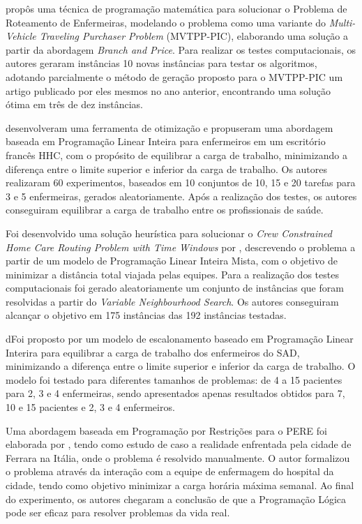 \cite{mansini:2016} propôs uma técnica de programação matemática para solucionar o Problema de Roteamento de Enfermeiras, modelando o problema como uma variante do \textit{Multi-Vehicle Traveling Purchaser Problem} (MVTPP-PIC), elaborando uma solução a partir da abordagem \textit{Branch and Price}. Para realizar os testes computacionais, os autores geraram instâncias 10 novas instâncias para testar os algoritmos, adotando parcialmente o método de geração proposto para o MVTPP-PIC um artigo publicado por eles mesmos no ano anterior, encontrando uma solução ótima em três de  dez instâncias.

\cite{bachouch:2010} desenvolveram uma ferramenta de otimização e propuseram uma abordagem baseada em Programação Linear Inteira  para enfermeiros em um escritório francês HHC, com o propósito de equilibrar a carga de trabalho, minimizando a diferença entre o limite superior e inferior da carga de trabalho. Os autores realizaram 60 experimentos, baseados em 10 conjuntos de 10, 15 e 20 tarefas para 3 e 5 enfermeiras, gerados aleatoriamente. Após a realização dos testes, os autores conseguiram equilibrar a carga de trabalho entre os profissionais de saúde.

Foi desenvolvido uma solução heurística para solucionar o \textit{Crew Constrained Home Care Routing Problem with Time Windows} por \cite{tozlu:2016}, descrevendo o problema a partir de um modelo de Programação Linear Inteira Mista, com o objetivo de minimizar a distância total viajada pelas equipes. Para a realização dos testes computacionais foi gerado aleatoriamente um conjunto de instâncias que foram  resolvidas a partir do \textit{Variable Neighbourhood Search}. Os autores conseguiram alcançar o objetivo em 175 instâncias das 192 instâncias testadas.

dFoi proposto por  \cite{trabelsi:2012} um modelo de escalonamento baseado em Programação Linear Interira para  equilibrar a carga de trabalho dos enfermeiros do \ac{SAD},  minimizando a diferença entre o limite superior e inferior da carga de trabalho. O modelo foi testado para diferentes tamanhos de problemas: de 4 a 15 pacientes para 2, 3 e 4 enfermeiras, sendo apresentados apenas resultados obtidos para 7, 10 e 15 pacientes e 2, 3 e 4 enfermeiros.

Uma abordagem baseada em Programação por Restrições para o \ac{PERE} foi elaborada por \cite{cattafi:2012}, tendo como estudo de caso a realidade enfrentada pela cidade de Ferrara na Itália, onde o problema é resolvido manualmente. O autor formalizou o problema através da interação com a equipe de enfermagem do hospital da cidade, tendo como objetivo minimizar a carga horária máxima semanal. Ao final do experimento, os autores chegaram a conclusão de que a Programação Lógica pode ser eficaz para resolver problemas da vida real.

